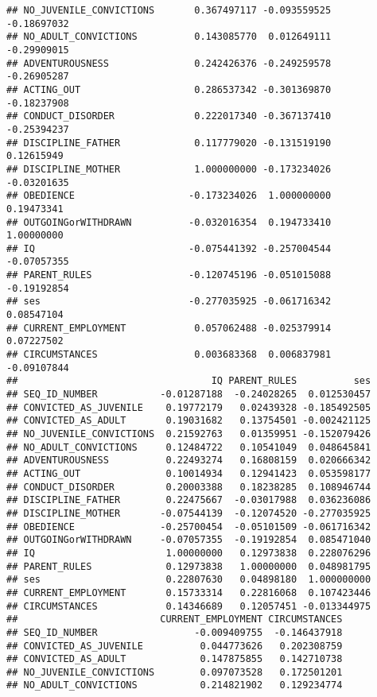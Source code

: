 \documentclass[]{article}
\begin{document}
\begin{verbatim}
## NO_JUVENILE_CONVICTIONS       0.367497117 -0.093559525         -0.18697032
## NO_ADULT_CONVICTIONS          0.143085770  0.012649111         -0.29909015
## ADVENTUROUSNESS               0.242426376 -0.249259578         -0.26905287
## ACTING_OUT                    0.286537342 -0.301369870         -0.18237908
## CONDUCT_DISORDER              0.222017340 -0.367137410         -0.25394237
## DISCIPLINE_FATHER             0.117779020 -0.131519190          0.12615949
## DISCIPLINE_MOTHER             1.000000000 -0.173234026         -0.03201635
## OBEDIENCE                    -0.173234026  1.000000000          0.19473341
## OUTGOINGorWITHDRAWN          -0.032016354  0.194733410          1.00000000
## IQ                           -0.075441392 -0.257004544         -0.07057355
## PARENT_RULES                 -0.120745196 -0.051015088         -0.19192854
## ses                          -0.277035925 -0.061716342          0.08547104
## CURRENT_EMPLOYMENT            0.057062488 -0.025379914          0.07227502
## CIRCUMSTANCES                 0.003683368  0.006837981         -0.09107844
##                                  IQ PARENT_RULES          ses
## SEQ_ID_NUMBER           -0.01287188  -0.24028265  0.012530457
## CONVICTED_AS_JUVENILE    0.19772179   0.02439328 -0.185492505
## CONVICTED_AS_ADULT       0.19031682   0.13754501 -0.002421125
## NO_JUVENILE_CONVICTIONS  0.21592763   0.01359951 -0.152079426
## NO_ADULT_CONVICTIONS     0.12484722   0.10541049  0.048645841
## ADVENTUROUSNESS          0.22493274   0.16808159  0.020666342
## ACTING_OUT               0.10014934   0.12941423  0.053598177
## CONDUCT_DISORDER         0.20003388   0.18238285  0.108946744
## DISCIPLINE_FATHER        0.22475667  -0.03017988  0.036236086
## DISCIPLINE_MOTHER       -0.07544139  -0.12074520 -0.277035925
## OBEDIENCE               -0.25700454  -0.05101509 -0.061716342
## OUTGOINGorWITHDRAWN     -0.07057355  -0.19192854  0.085471040
## IQ                       1.00000000   0.12973838  0.228076296
## PARENT_RULES             0.12973838   1.00000000  0.048981795
## ses                      0.22807630   0.04898180  1.000000000
## CURRENT_EMPLOYMENT       0.15733314   0.22816068  0.107423446
## CIRCUMSTANCES            0.14346689   0.12057451 -0.013344975
##                         CURRENT_EMPLOYMENT CIRCUMSTANCES
## SEQ_ID_NUMBER                 -0.009409755  -0.146437918
## CONVICTED_AS_JUVENILE          0.044773626   0.202308759
## CONVICTED_AS_ADULT             0.147875855   0.142710738
## NO_JUVENILE_CONVICTIONS        0.097073528   0.172501201
## NO_ADULT_CONVICTIONS           0.214821902   0.129234774

\end{verbatim}
\end{document}
